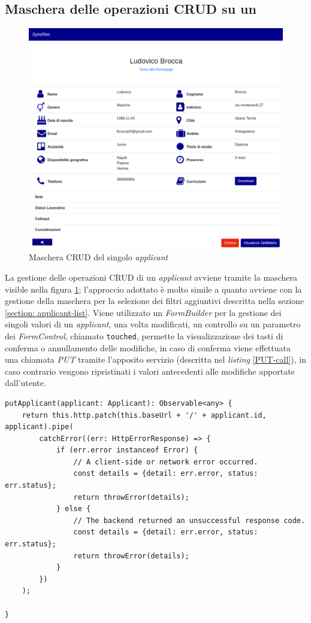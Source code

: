 \subsection{Maschera delle operazioni CRUD su un\applicant}\label{m-CRUD}
\vspace{0.5em}
\begin{figure}[!h] 
	\centering 
	\includegraphics[width=1\columnwidth]{immagini/svil/applicant}
	\caption{Maschera \gls{CRUD} del singolo \textit{applicant}}
	\label{figura:applicant}
\end{figure}
La gestione delle operazioni \gls{CRUD} di un \textit{applicant} avviene tramite la maschera visible nella figura \ref{figura:applicant}; l'approccio adottato è molto simile a quanto avviene con la gestione della maschera per la selezione dei filtri aggiuntivi descritta nella sezione \ref{section: applicant-list}. Viene utilizzato un \textit{FormBuilder} per la gestione dei singoli valori di un \textit{applicant}, una volta modificati, un controllo su un parametro dei \textit{FormControl}, chiamato \texttt{touched}, permette la visualizzazione dei tasti di conferma o annullamento delle modifiche, in caso di conferma viene effettuata una chiamata \textit{PUT} tramite l'apposito servizio (descritta nel \textit{listing} \ref{PUT-call}), in caso contrario vengono ripristinati i valori antecedenti alle modifiche apportate dall'utente.\\
\newpage
\begin{lstlisting}[label=PUT-call, caption=chiamata PUT al microservizio del Back-end di SyncRec]
putApplicant(applicant: Applicant): Observable<any> {
	return this.http.patch(this.baseUrl + '/' + applicant.id, applicant).pipe(
		catchError((err: HttpErrorResponse) => {
			if (err.error instanceof Error) {
				// A client-side or network error occurred.
				const details = {detail: err.error, status: err.status};
				return throwError(details);
			} else {
				// The backend returned an unsuccessful response code.
				const details = {detail: err.error, status: err.status};
				return throwError(details);
			}
		})
	);
	
}
\end{lstlisting}
